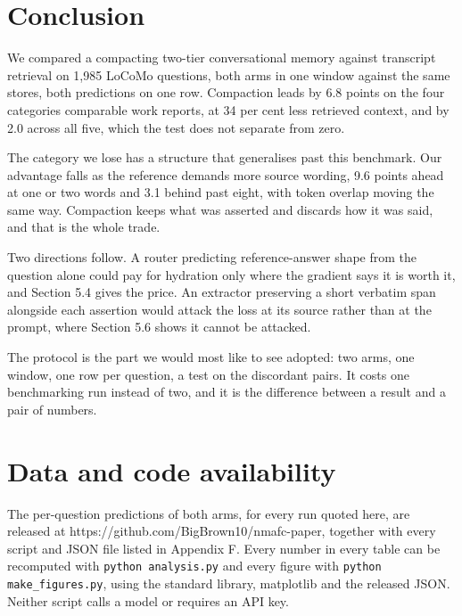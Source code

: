 \documentclass[10pt,a4paper,twocolumn]{article}
\begin{document}
\section{Conclusion}

We compared a compacting two-tier conversational memory against transcript retrieval on 1,985 LoCoMo questions, both arms in one window against the same stores, both predictions on one row. Compaction leads by 6.8 points on the four categories comparable work reports, at 34 per cent less retrieved context, and by 2.0 across all five, which the test does not separate from zero.

The category we lose has a structure that generalises past this benchmark. Our advantage falls as the reference demands more source wording, 9.6 points ahead at one or two words and 3.1 behind past eight, with token overlap moving the same way. Compaction keeps what was asserted and discards how it was said, and that is the whole trade.

Two directions follow. A router predicting reference-answer shape from the question alone could pay for hydration only where the gradient says it is worth it, and Section 5.4 gives the price. An extractor preserving a short verbatim span alongside each assertion would attack the loss at its source rather than at the prompt, where Section 5.6 shows it cannot be attacked.

The protocol is the part we would most like to see adopted: two arms, one window, one row per question, a test on the discordant pairs. It costs one benchmarking run instead of two, and it is the difference between a result and a pair of numbers.

\section*{Data and code availability}

The per-question predictions of both arms, for every run quoted here, are released at https://github.com/BigBrown10/nmafc-paper, together with every script and JSON file listed in Appendix F. Every number in every table can be recomputed with \texttt{python analysis.py} and every figure with \texttt{python make\_figures.py}, using the standard library, matplotlib and the released JSON. Neither script calls a model or requires an API key.
\end{document}
